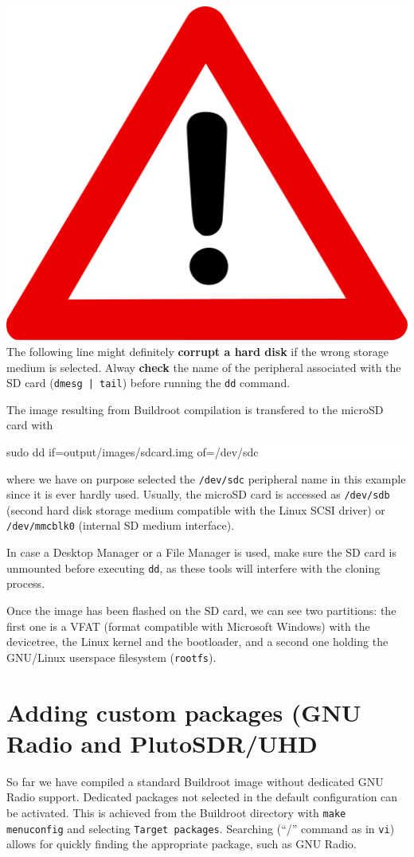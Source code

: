 \documentclass[a4paper]{article}
\begin{document}
\includegraphics[width=.7cm]{danger} 
The following line might definitely {\bf corrupt a hard disk} if the wrong storage
medium is selected. Alway {\bf check} the name of the peripheral associated with
the SD card (\verb~dmesg | tail~) before running the {\tt dd} command.

The image resulting from Buildroot compilation is transfered to the microSD card with\\
\colorbox{white}{\begin{minipage}{0.9\textwidth}
sudo dd if=output/images/sdcard.img of=/dev/sdc
\end{minipage}} 
where we have on purpose selected the {\tt /dev/sdc} peripheral name in this example
since it is ever hardly used. Usually, the microSD card is accessed as {\tt /dev/sdb} 
(second hard disk storage medium compatible with the Linux SCSI driver)
or {\tt /dev/mmcblk0} (internal SD medium interface).

In case a Desktop Manager or a File Manager is used, make sure the SD card is unmounted
before executing {\tt dd}, as these tools will interfere with the cloning process.

\noindent{}

Once the image has been flashed on the SD card, we can see two partitions: the first one
is a VFAT (format compatible with Microsoft Windows) with the devicetree, the Linux 
kernel and the bootloader, and a second one holding the GNU/Linux userspace filesystem
({\tt rootfs}).

\section{Adding custom packages (GNU Radio and PlutoSDR/UHD}

So far we have compiled a standard Buildroot image without dedicated GNU Radio support.
Dedicated packages not selected in the default configuration can be activated. This is 
achieved from the Buildroot directory with {\tt make menuconfig} and selecting {\tt Target 
packages}. Searching (``/'' command as in {\tt vi}) allows for quickly finding the appropriate
package, such as GNU Radio. 
\end{document}
